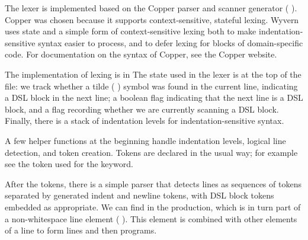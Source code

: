 \documentclass{article}
\begin{document}
\begin{mdP}[data-line={81}]%
{}The lexer is implemented based on the Copper parser and scanner generator
(%
{}%
{}).  Copper was chosen because it
supports context-sensitive, stateful lexing.  Wyvern uses state and a
simple form of context-sensitive lexing both to make indentation-sensitive
syntax easier to process, and to defer lexing for blocks of domain-specific
code.  For documentation on the syntax of Copper, see the Copper website.%
\end{mdP}%
\begin{mdP}[class={indent},data-line={88}]%
{}The implementation of lexing is in
{}%
{}  The state used in the
lexer is at the top of the file: we track whether a tilde (%
{}\mdCode[class={code,code1}]{{\textasciitilde}}%
{}) symbol
was found in the current line, indicating a DSL block in the next line;
a boolean flag indicating that the next line is a DSL block, and a flag
recording whether we are currently scanning a DSL block.  Finally, there
is a stack of indentation levels for indentation-sensitive syntax.%
\end{mdP}%
\begin{mdP}[class={indent},data-line={96}]%
{}A few helper functions at the beginning handle indentation levels,
logical line detection, and token creation.  Tokens are declared in the
usual way; for example see the %
{}%
{} token used for the %
{}%
{}
keyword.%
\end{mdP}%
\begin{mdP}[class={indent},data-line={101}]%
{}After the tokens, there is a simple parser that detects lines as sequences
of tokens separated by generated indent and newline tokens, with DSL
block tokens embedded as appropriate.  We can find %
{}%
{} in the %
{}%
{}
production, which is in turn part of a non-whitespace line element
(%
{}%
{}).  This element is combined with other elements of
a line to form lines and then programs.%
\end{mdP}%
\end{document}
